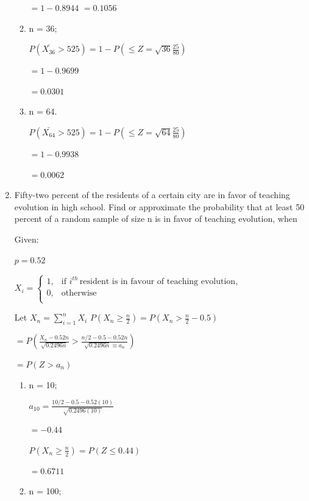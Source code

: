 \documentclass{article}
\begin{document}
\begin{enumerate}
\begin{enumerate}
        $= 1 - 0.8944$
        $= 0.1056$

        \item n = 36;

        $\displaystyle P(\bar{X_36} > 525) = 1 - P\left(\leq Z = \sqrt{36}\frac{25}{80}\right)$
        
        $= 1 - 0.9699$
        
        $= 0.0301$

        \item n = 64.

        $\displaystyle P(\bar{X_64} > 525) = 1 - P\left(\leq Z = \sqrt{64}\frac{25}{80}\right)$
        
        $= 1 - 0.9938$
        
        $= 0.0062$
    \end{enumerate}
    \item Fifty-two percent of the residents of a certain city are in favor of teaching evolution in high school. Find or approximate the probability that at least 50 percent of a random sample of size n is in favor of teaching evolution, when
    
    Given:

    $p = 0.52$

    $X_i = 
    \begin{cases}
    1, & \text{if } i^{th} \, \text{resident is in favour of teaching evolution},\\
    0, & \text{otherwise}\\
    \end{cases}$

    Let $X_n = \displaystyle \sum_{i=1}^n{X_i}$
    $P\left(X_n \geq \frac{n}{2}\right) = P\left(X_n > \frac{n}{2} - 0.5\right)$

    $= P\left(\frac{X_n - 0.52n}{\sqrt{0.2496n}} > \frac{n/2 - 0.5 - 0.52n}{\sqrt{0.2496n} \equiv a_n}\right)$

    $= P(Z > a_n)$

    \begin{enumerate}
        \item n = 10;
        
        $a_{10} = \frac{10/2 - 0.5 -0.52(10)}{\sqrt{0.2496(10)}}$

        $= -0.44$

        $P\left(X_n \geq \frac{n}{2}\right) = P\left(Z \leq 0.44\right)$

        $= 0.6711$
        \item n = 100;
        

\end{enumerate}
\end{enumerate}
\end{document}
